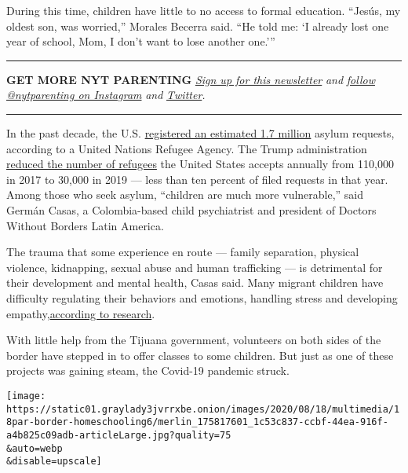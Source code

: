 During this time, children have little to no access to formal education.
``Jesús, my oldest son, was worried,'' Morales Becerra said. ``He told
me: `I already lost one year of school, Mom, I don't want to lose
another one.'''

\begin{center}\rule{0.5\linewidth}{\linethickness}\end{center}

\textbf{GET MORE NYT PARENTING}
\href{https://www.nytimes3xbfgragh.onion/newsletters/parenting?action=click\&module=RelatedLinks\&pgtype=Article}{\emph{Sign
up for this newsletter}} \emph{and}
\href{https://www.instagram.com/nytparenting/}{\emph{follow
@nytparenting on Instagram}} \emph{and}
\href{https://twitter.com/nytparenting/}{\emph{Twitter}}\emph{.}

\begin{center}\rule{0.5\linewidth}{\linethickness}\end{center}

In the past decade, the U.S.
\href{https://www.unhcr.org/globaltrends2019/}{registered an estimated
1.7 million} asylum requests, according to a United Nations Refugee
Agency. The Trump administration
\href{https://www.migrationpolicy.org/article/refugees-and-asylees-united-states-2018}{reduced
the number of refugees} the United States accepts annually from 110,000
in 2017 to 30,000 in 2019 --- less than ten percent of filed requests in
that year. Among those who seek asylum, ``children are much more
vulnerable,'' said Germán Casas, a Colombia-based child psychiatrist and
president of Doctors Without Borders Latin America.

The trauma that some experience en route --- family separation, physical
violence, kidnapping, sexual abuse and human trafficking --- is
detrimental for their development and mental health, Casas said. Many
migrant children have difficulty regulating their behaviors and
emotions, handling stress and developing
empathy,\href{https://onlinelibrary.wiley.com/doi/book/10.1002/9780470669280}{according
to research}.

With little help from the Tijuana government, volunteers on both sides
of the border have stepped in to offer classes to some children. But
just as one of these projects was gaining steam, the Covid-19 pandemic
struck.

\texttt{[image: https://static01.graylady3jvrrxbe.onion/images/2020/08/18/multimedia/18par-border-homeschooling6/merlin\_175817601\_1c53c837-ccbf-44ea-916f-a4b825c09adb-articleLarge.jpg?quality=75\\\&auto=webp\\\&disable=upscale]}

